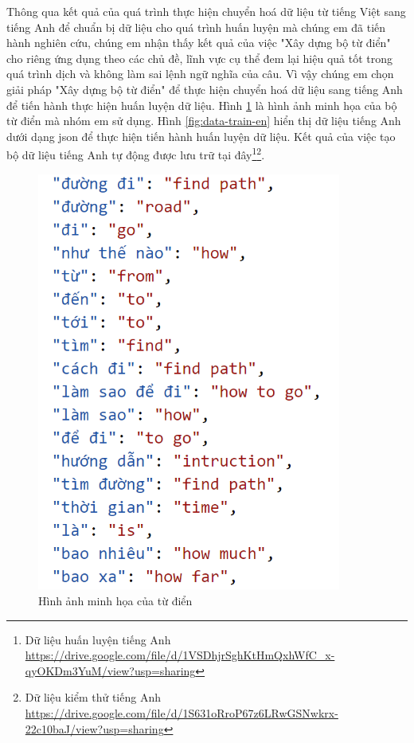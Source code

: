 Thông qua kết quả của quá trình thực hiện chuyển hoá dữ liệu từ tiếng Việt sang tiếng Anh để chuẩn bị dữ liệu cho quá trình huấn luyện mà chúng em đã tiến hành nghiên cứu, chúng em nhận thấy kết quả của việc "Xây dựng bộ từ điển" cho riêng ứng dụng theo các chủ đề, lĩnh vực cụ thể đem lại hiệu quả tốt trong quá trình dịch và không làm sai lệnh ngữ nghĩa của câu. Vì vậy chúng em chọn giải pháp "Xây dựng bộ từ điển" để thực hiện chuyển hoá dữ liệu sang tiếng Anh để tiến hành thực hiện huấn luyện dữ liệu. Hình \ref{fig:dictonary} là hình ảnh minh họa của bộ từ điển mà nhóm em sử dụng. Hình \ref{fig:data-train-en} hiển thị dữ liệu tiếng Anh dưới dạng json để thực hiện tiến hành huấn luyện dữ liệu. Kết quả của việc tạo bộ dữ liệu tiếng Anh tự động được lưu trữ tại đây\footnote{Dữ liệu huấn luyện tiếng Anh \url{https://drive.google.com/file/d/1VSDhjrSghKtHmQxhWfC_x-qyOKDm3YuM/view?usp=sharing}}\footnote{Dữ liệu kiểm thử tiếng Anh \url{https://drive.google.com/file/d/1S631oRroP67z6LRwGSNwkrx-22c10baJ/view?usp=sharing}}.

\begin{figure}[H]
    \centering
    \includegraphics[width=10cm]{images/dictionary.png}
    \caption{Hình ảnh minh họa của từ điển}
    \label{fig:dictonary} 
\end{figure}




